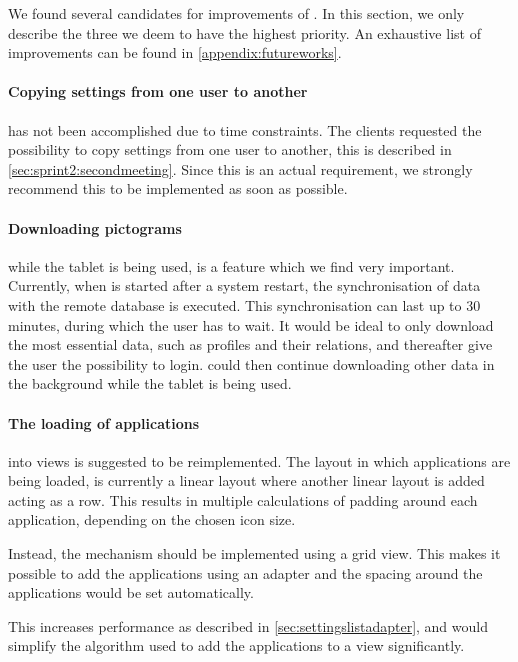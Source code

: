 We found several candidates for improvements of \launcher.
In this section, we only describe the three we deem to have the highest priority.
An exhaustive list of improvements can be found in \cref{appendix:futureworks}.

\paragraph{Copying settings from one user to another} has not been accomplished due to time constraints.
The clients requested the possibility to copy settings from one user to another, this is described in \cref{sec:sprint2:secondmeeting}.
Since this is an actual requirement, we strongly recommend this to be implemented as soon as possible.

\paragraph{Downloading pictograms} while the tablet is being used, is a feature which we find very important.
Currently, when \launcher is started after a system restart, the synchronisation of data with the remote database is executed.
This synchronisation can last up to 30 minutes, during which the user has to wait.
It would be ideal to only download the most essential data, such as profiles and their relations, and thereafter give the user the possibility to login.
\launcher could then continue downloading other data in the background while the tablet is being used.

\paragraph{The loading of applications} into views is suggested to be reimplemented. 
The layout in which applications are being loaded, is currently a linear layout where another linear layout is added acting as a row.
This results in multiple calculations of padding around each application, depending on the chosen icon size.

Instead, the mechanism should be implemented using a grid view.
This makes it possible to add the applications using an adapter and the spacing around the applications would be set automatically.

This increases performance as described in \cref{sec:settingslistadapter}, and would simplify the algorithm used to add the applications to a view significantly.